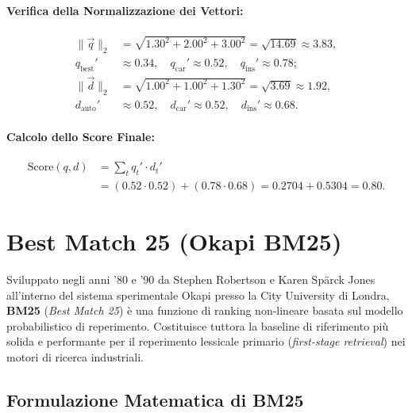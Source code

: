 \paragraph{Verifica della Normalizzazione dei Vettori:}
\begin{align*}
\|\vec{q}\|_2 &= \sqrt{1.30^2 + 2.00^2 + 3.00^2} = \sqrt{14.69} \approx 3.83, \\
q_{\text{best}}' &\approx 0.34, \quad q_{\text{car}}' \approx 0.52, \quad q_{\text{ins}}' \approx 0.78; \\
\|\vec{d}\|_2 &= \sqrt{1.00^2 + 1.00^2 + 1.30^2} = \sqrt{3.69} \approx 1.92, \\
d_{\text{auto}}' &\approx 0.52, \quad d_{\text{car}}' \approx 0.52, \quad d_{\text{ins}}' \approx 0.68.
\end{align*}

\paragraph{Calcolo dello Score Finale:}
\begin{align}
\text{Score}(q, d) &= \sum_{t} q_t' \cdot d_t' \nonumber \\
&= (0.52 \cdot 0.52) + (0.78 \cdot 0.68) = 0.2704 + 0.5304 = \mathbf{0.80}.
\end{align}

\FloatBarrier
\section{Best Match 25 (Okapi BM25)}
\label{sec:bm25-deep}

Sviluppato negli anni '80 e '90 da Stephen Robertson e Karen Sp\"arck Jones all'interno del sistema sperimentale Okapi presso la City University di Londra, \textbf{BM25} (\textit{Best Match 25}) \`e una funzione di ranking non-lineare basata sul modello probabilistico di reperimento. Costituisce tuttora la baseline di riferimento pi\`u solida e performante per il reperimento lessicale primario (\textit{first-stage retrieval}) nei motori di ricerca industriali.

\subsection{Formulazione Matematica di BM25}


